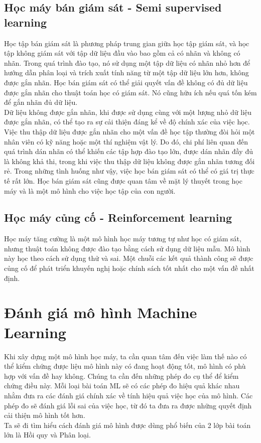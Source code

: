 \subsection{Học máy bán giám sát - Semi supervised learning}
Học tập bán giám sát là phương pháp trung gian giữa học tập giám sát, và học tập không giám sát với tập dữ liệu đầu vào bao gồm cả có nhãn và không có nhãn. Trong quá trình đào tạo, nó sử dụng một tập dữ liệu có nhãn nhỏ hơn để hướng dẫn phân loại và trích xuất tính năng từ một tập dữ liệu lớn hơn, không được gắn nhãn. Học bán giám sát có thể giải quyết vấn đề không có đủ dữ liệu được gắn nhãn cho thuật toán học có giám sát. Nó cũng hữu ích nếu quá tốn kém để gắn nhãn đủ dữ liệu.\\
Dữ liệu không được gắn nhãn, khi được sử dụng cùng với một lượng nhỏ dữ liệu được gắn nhãn, có thể tạo ra sự cải thiện đáng kể về độ chính xác của việc học. Việc thu thập dữ liệu được gắn nhãn cho một vấn đề học tập thường đòi hỏi một nhân viên có kỹ năng hoặc một thí nghiệm vật lý.  Do đó, chi phí liên quan đến quá trình dán nhãn có thể khiến các tập hợp đào tạo lớn, được dán nhãn đầy đủ là không khả thi, trong khi việc thu thập dữ liệu không được gắn nhãn tương đối rẻ. Trong những tình huống như vậy, việc học bán giám sát có thể có giá trị thực tế rất lớn. Học bán giám sát cũng được quan tâm về mặt lý thuyết trong học máy và là một mô hình cho việc học tập của con người.
\subsection{Học máy củng cố - Reinforcement learning}
Học máy tăng cường là một mô hình học máy tương tự như học có giám sát, nhưng thuật toán không được đào tạo bằng cách sử dụng dữ liệu mẫu. Mô hình này học theo cách sử dụng thử và sai. Một chuỗi các kết quả thành công sẽ được củng cố để phát triển khuyến nghị hoặc chính sách tốt nhất cho một vấn đề nhất định.
\section{Đánh giá mô hình Machine Learning}
Khi xây dựng một mô hình học máy, ta cần quan tâm đến việc làm thế nào có thể kiểm chứng được liệu mô hình này có đang hoạt động tốt, mô hình có phù hợp với vấn đề hay không. Chúng ta cần đến những phép đo cụ thể để kiểm chứng điều này. Mỗi loại bài toán ML sẽ có các phép đo hiệu quả khác nhau nhằm đưa ra các đánh giá chính xác về tính hiệu quả việc học của mô hình. Các phép đo sẽ đánh giá lỗi sai của việc học, từ đó ta đưa ra được những quyết định cải thiện mô hình tốt hơn.\\
Ta sẽ đi tìm hiểu cách đánh giá mô hình được dùng phổ biến của 2 lớp bài toán lớn là Hồi quy và Phân loại.
